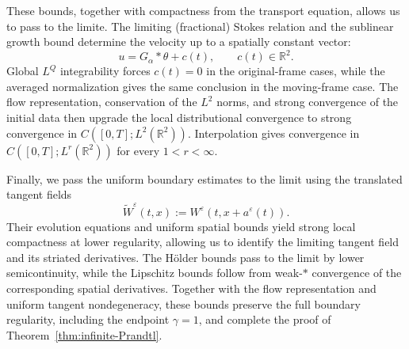\documentclass[reqno,11pt,a4paper]{amsart}
\begin{document}
These bounds, together with compactness from the transport
equation, allows us to pass to the limite.
The limiting (fractional) Stokes relation and
the sublinear growth bound determine the velocity
up to a spatially constant vector:
\[
  u=G_\alpha*\theta+c(t),
  \qquad c(t)\in\mathbb R^2.
\]
Global $L^Q$ integrability forces $c(t)=0$
in the original-frame cases,
while the averaged normalization gives the same conclusion
in the moving-frame case.
The flow representation, conservation of the $L^2$ norms,
and strong convergence of the initial data then upgrade
the local distributional convergence to strong convergence
in $C([0,T];L^2(\mathbb R^2))$.
Interpolation gives convergence in $C([0,T];L^r(\mathbb R^2))$
for every $1<r<\infty$.

Finally, we pass the uniform boundary estimates to the limit
using the translated tangent fields
\[
  \widetilde W^\varepsilon(t,x)
  :=W^\varepsilon(t,x+a^\varepsilon(t)).
\]
Their evolution equations and uniform spatial bounds
yield strong local compactness at lower regularity,
allowing us to identify the limiting tangent field
and its striated derivatives.
The H\"older bounds pass to the limit by lower semicontinuity,
while the Lipschitz bounds follow from weak-$*$ convergence
of the corresponding spatial derivatives.
Together with the flow representation
and uniform tangent nondegeneracy,
these bounds preserve the full boundary regularity,
including the endpoint $\gamma=1$,
and complete the proof of
Theorem~\ref{thm:infinite-Prandtl}.
\end{document}
